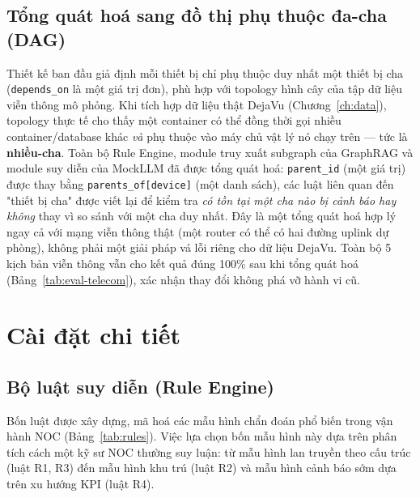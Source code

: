 \documentclass[12pt,a4paper]{report}
\newcommand{\code}[1]{\texttt{\small #1}}
\begin{document}
\section{Tổng quát hoá sang đồ thị phụ thuộc đa-cha (DAG)}
\label{sec:daghoa}

Thiết kế ban đầu giả định mỗi thiết bị chỉ phụ thuộc duy nhất một thiết bị cha (\code{depends\_on}
là một giá trị đơn), phù hợp với topology hình cây của tập dữ liệu viễn thông mô phỏng. Khi tích
hợp dữ liệu thật DejaVu (Chương~\ref{ch:data}), topology thực tế cho thấy một container có thể
đồng thời gọi nhiều container/database khác \emph{và} phụ thuộc vào máy chủ vật lý nó chạy trên
--- tức là \textbf{nhiều-cha}. Toàn bộ Rule Engine, module truy xuất subgraph của GraphRAG và
module suy diễn của MockLLM đã được tổng quát hoá: \code{parent\_id} (một giá trị) được thay bằng
\code{parents\_of[device]} (một danh sách), các luật liên quan đến "thiết bị cha" được viết lại để
kiểm tra \emph{có tồn tại một cha nào bị cảnh báo hay không} thay vì so sánh với một cha duy nhất.
Đây là một tổng quát hoá hợp lý ngay cả với mạng viễn thông thật (một router có thể có hai đường
uplink dự phòng), không phải một giải pháp vá lỗi riêng cho dữ liệu DejaVu. Toàn bộ 5 kịch bản viễn
thông vẫn cho kết quả đúng 100\% sau khi tổng quát hoá (Bảng~\ref{tab:eval-telecom}), xác nhận thay
đổi không phá vỡ hành vi cũ.

\chapter{Cài đặt chi tiết}

\section{Bộ luật suy diễn (Rule Engine)}

Bốn luật được xây dựng, mã hoá các mẫu hình chẩn đoán phổ biến trong vận hành NOC
(Bảng~\ref{tab:rules}). Việc lựa chọn bốn mẫu hình này dựa trên phân tích cách một kỹ sư NOC thường
suy luận: từ mẫu hình lan truyền theo cấu trúc (luật R1, R3) đến mẫu hình khu trú
(luật R2) và mẫu hình cảnh báo sớm dựa trên xu hướng KPI (luật R4).
\end{document}

